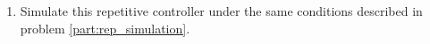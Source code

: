 \begin{enumerate}
\begin{enumerate}
        \item
        Simulate this repetitive controller under the same conditions described in problem \ref{part:rep_simulation}.
    \end{enumerate}
\end{enumerate}
